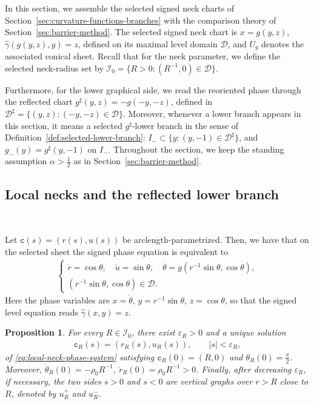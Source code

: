 \documentclass{amsart}
\theoremstyle{plain}
\newtheorem{proposition}[theorem]{Proposition}
\theoremstyle{mainintrothm}
\theoremstyle{definition}
\begin{document}
In this section, we assemble the selected signed neck charts of
Section~\ref{sec:curvature-functions-branches} with the comparison theory of
Section~\ref{sec:barrier-method}.  The selected signed neck chart is $x=g(y,z)$,
$\widehat\gamma(g(y,z),y)=z$, defined on its maximal level domain $\mathcal D$, and $U_g$ denotes the
associated conical sheet. Recall that for the neck parameter, we define the selected neck-radius set by $\mathcal I_0=\{R>0:(R^{-1},0)\in\mathcal D\}$. 

\medskip

Furthermore, for the lower graphical side, we read the reoriented phase through the reflected chart $g^\sharp(y,z)=-g(-y,-z)$, defined in $\mathcal D^\sharp=\{(y,z):(-y,-z)\in\mathcal D\}$. Moreover, whenever a lower branch appears in this section, it means a selected $g^\sharp$-lower branch in the sense of Definition~\ref{def:selected-lower-branch}: $I_-\subset\{y:(y,-1)\in\mathcal D^\sharp\}$, and $g_-(y)=g^\sharp(y,-1)$ on $I_-$.
Throughout the section, we keep the standing assumption $\alpha>\frac{1}{2}$ as in
Section~\ref{sec:barrier-method}.

\subsection{Local necks and the reflected lower branch}\,
\label{subsec:local-catenoidal-neck}

Let $\mathtt c(s)=(r(s),u(s))$ be arclength-parametrized. Then, we have that on the selected sheet the signed phase equation is equivalent to
\begin{align}
	\begin{cases}\label{eq:local-neck-phase-system}
		\dot r=\cos\theta,\quad
		\dot u=\sin\theta,\quad
		\dot\theta=g\left(r^{-1}\sin\theta,\cos\theta\right), 
		\\
		\left(r^{-1}\sin\theta,\cos\theta\right)\in\mathcal D.
	\end{cases}	
\end{align}
Here the phase variables are $x=\dot\theta$, $y=r^{-1}\sin\theta$, $z=\cos\theta$, so that the signed level equation reads $\widehat\gamma(x,y)=z$.

\begin{proposition}
	\label{prop:local-catenoidal-neck}
	For every $R\in\mathcal I_0$, there exist $\varepsilon_R>0$ and a unique
	solution
	\begin{align*}
		\mathtt c_R(s)=(r_R(s),u_R(s)),
		\qquad
		|s|<\varepsilon_R,
	\end{align*}
	of \eqref{eq:local-neck-phase-system} satisfying $\mathtt{c}_R(0)=(R,0)$ and  $\theta_R(0)=\frac{\pi}{2}$. Moreover, $\dot\theta_R(0)=-\rho_0R^{-1}$, $\ddot r_R(0)=\rho_0R^{-1}>0$. Finally, after decreasing $\varepsilon_R$, if necessary, the two sides $s>0$ and
	$s<0$ are vertical graphs over $r>R$ close to $R$, denoted by $u_R^+$ and
	$u_R^-$.
\end{proposition}
\end{document}
